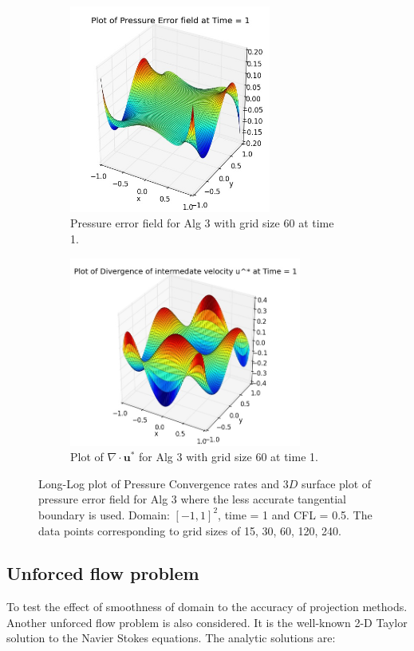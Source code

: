 \begin{figure}[H]
	\begin{subfigure}[t]{2.6in}
		\centering
		\includegraphics[width=2.6in]{figures/Pm2D_pf2_np_P_error_t_1_grid_60.jpg}
		\caption{Pressure error field for Alg 3 with grid size 60 at time 1. }\label{fig:6.19b}
	\end{subfigure}
	\begin{subfigure}[t]{3.0in}
		\centering
		\includegraphics[width=3.0in]{figures/Pm2D_pf2_np_div_uvstar_t_1_grid_60.jpg}
		\caption{Plot of $\nabla \cdot \textbf{u}^*$ for Alg 3 with grid size 60 at time 1. }\label{fig:6.19b}
	\end{subfigure}
	\caption{Long-Log plot of Pressure Convergence rates and $3D$ surface plot of pressure error field for Alg 3 where the less accurate tangential boundary is used. Domain: $[-1,1]^2$, time = 1 and CFL = 0.5. The data points corresponding to grid sizes of 15, 30, 60, 120, 240.}\label{fig:6.19c}
\end{figure}

\newpage
\subsection{Unforced flow problem}

To test the effect of smoothness of domain to the accuracy of projection methods. Another unforced flow problem is also considered. It is the well-known 2-D Taylor solution to the Navier Stokes equations. The analytic solutions are:

